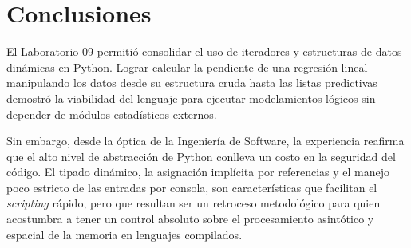 \documentclass[11pt]{article}
\begin{document}
\section{Conclusiones}

El Laboratorio 09 permitió consolidar el uso de iteradores y estructuras de datos dinámicas en Python. Lograr calcular la pendiente de una regresión lineal manipulando los datos desde su estructura cruda hasta las listas predictivas demostró la viabilidad del lenguaje para ejecutar modelamientos lógicos sin depender de módulos estadísticos externos.

Sin embargo, desde la óptica de la Ingeniería de Software, la experiencia reafirma que el alto nivel de abstracción de Python conlleva un costo en la seguridad del código. El tipado dinámico, la asignación implícita por referencias y el manejo poco estricto de las entradas por consola, son características que facilitan el \textit{scripting} rápido, pero que resultan ser un retroceso metodológico para quien acostumbra a tener un control absoluto sobre el procesamiento asintótico y espacial de la memoria en lenguajes compilados.
\end{document}
